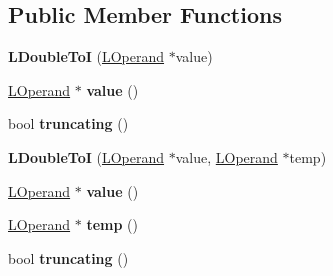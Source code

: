\subsection*{Public Member Functions}
\begin{DoxyCompactItemize}
\item 
{\bfseries L\+Double\+ToI} (\hyperlink{classv8_1_1internal_1_1_l_operand}{L\+Operand} $\ast$value)\hypertarget{classv8_1_1internal_1_1_l_double_to_i_a12c51150d782e593139060eb731d041e}{}\label{classv8_1_1internal_1_1_l_double_to_i_a12c51150d782e593139060eb731d041e}

\item 
\hyperlink{classv8_1_1internal_1_1_l_operand}{L\+Operand} $\ast$ {\bfseries value} ()\hypertarget{classv8_1_1internal_1_1_l_double_to_i_a84ad1eabcc8f71d9276027a193e1e691}{}\label{classv8_1_1internal_1_1_l_double_to_i_a84ad1eabcc8f71d9276027a193e1e691}

\item 
bool {\bfseries truncating} ()\hypertarget{classv8_1_1internal_1_1_l_double_to_i_a6c9f2bfa1a4032aa44222ad95b30ff5c}{}\label{classv8_1_1internal_1_1_l_double_to_i_a6c9f2bfa1a4032aa44222ad95b30ff5c}

\item 
{\bfseries L\+Double\+ToI} (\hyperlink{classv8_1_1internal_1_1_l_operand}{L\+Operand} $\ast$value, \hyperlink{classv8_1_1internal_1_1_l_operand}{L\+Operand} $\ast$temp)\hypertarget{classv8_1_1internal_1_1_l_double_to_i_adc8669b5c70dfb46b04d259bc0396022}{}\label{classv8_1_1internal_1_1_l_double_to_i_adc8669b5c70dfb46b04d259bc0396022}

\item 
\hyperlink{classv8_1_1internal_1_1_l_operand}{L\+Operand} $\ast$ {\bfseries value} ()\hypertarget{classv8_1_1internal_1_1_l_double_to_i_a84ad1eabcc8f71d9276027a193e1e691}{}\label{classv8_1_1internal_1_1_l_double_to_i_a84ad1eabcc8f71d9276027a193e1e691}

\item 
\hyperlink{classv8_1_1internal_1_1_l_operand}{L\+Operand} $\ast$ {\bfseries temp} ()\hypertarget{classv8_1_1internal_1_1_l_double_to_i_a99be894a01e64bc33226c8aa27b021a0}{}\label{classv8_1_1internal_1_1_l_double_to_i_a99be894a01e64bc33226c8aa27b021a0}

\item 
bool {\bfseries truncating} ()\hypertarget{classv8_1_1internal_1_1_l_double_to_i_a6c9f2bfa1a4032aa44222ad95b30ff5c}{}\label{classv8_1_1internal_1_1_l_double_to_i_a6c9f2bfa1a4032aa44222ad95b30ff5c}


\end{DoxyCompactItemize}
